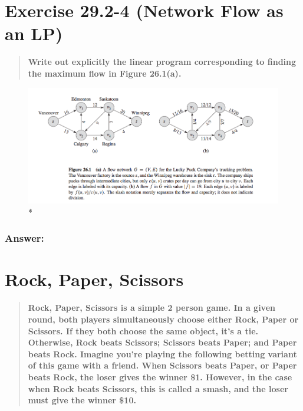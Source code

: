 \documentclass[titlepage]{article}\usepackage[]{graphicx}\usepackage[]{color}
\begin{document}
\section{Exercise 29.2-4 (Network Flow as an LP)}
  \begin{quote}
    \textbf{Write out explicitly the linear program corresponding to finding
    the maximum flow in Figure 26.1(a).}
  \end{quote}
  \begin{figure}
    \begin{center}
    \includegraphics[scale=0.40]{26.1a.png}\\*
    \end{center}
  \end{figure}

  \subsubsection{Answer:}
  \vspace{9cm}
\section{Rock, Paper, Scissors}
  \begin{quote}
    \textbf{Rock, Paper, Scissors is a simple 2 person game. In a given round,
    both players simultaneously choose either Rock, Paper or Scissors. If they
    both choose the same object, it’s a tie. Otherwise, Rock beats Scissors;
    Scissors beats Paper; and Paper beats Rock. Imagine you’re playing the
    following betting variant of this game with a friend. When Scissors beats
    Paper, or Paper beats Rock, the loser gives the winner \$1. However, in the case
    when Rock beats Scissors, this is called a \textbf{smash}, and the loser must give the
    winner \$10.}
  \end{quote}
\end{document}
